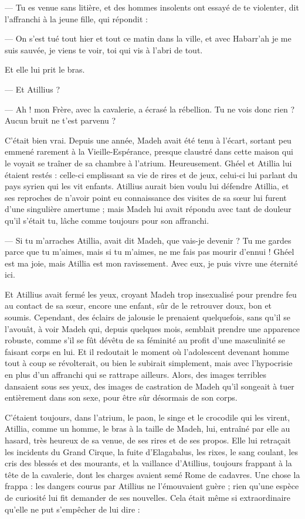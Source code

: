 \documentclass[a4paper, 11pt, oneside, polutonikogreek, french]{article}
\begin{document}
--- Tu es venue sans litière, et des hommes insolents ont essayé de te violenter, dit l'affranchi à la jeune fille, qui répondit :

--- On s'est tué tout hier et tout ce matin dans la ville, et avec Habarr'ah je me suis sauvée, je viens te voir, toi qui vis à l'abri de tout.

Et elle lui prit le bras.

--- Et Atillius ?

--- Ah ! mon Frère, avec la cavalerie, a écrasé la rébellion. Tu ne vois donc rien ? Aucun bruit ne t'est parvenu ?

C'était bien vrai. Depuis une année, Madeh avait été tenu à l'écart, sortant peu emmené rarement à la Vieille-Espérance, presque claustré dans cette maison qui le voyait se traîner de sa chambre à l'atrium. Heureusement. Ghéel et Atillia lui étaient restés : celle-ci emplissant sa vie de rires et de jeux, celui-ci lui parlant du pays syrien qui les vit enfants. Atillius aurait bien voulu lui défendre Atillia, et ses reproches de n'avoir point eu connaissance des visites de sa sœur lui furent d'une singulière amertume ; mais Madeh lui avait répondu avec tant de douleur qu'il s'était tu, lâche comme toujours pour son affranchi.

--- Si tu m'arraches Atillia, avait dit Madeh, que vais-je devenir ? Tu me gardes parce que tu m'aimes, mais si tu m'aimes, ne me fais pas mourir d'ennui ! Ghéel est ma joie, mais Atillia est mon ravissement. Avec eux, je puis vivre une éternité ici.

Et Atillius avait fermé les yeux, croyant Madeh trop insexualisé pour prendre feu au contact de sa sœur, encore une enfant, sûr de le retrouver doux, bon et soumis. Cependant, des éclairs de jalousie le prenaient quelquefois, sans qu'il se l'avouât, à voir Madeh qui, depuis quelques mois, semblait prendre une apparence robuste, comme s'il se fût dévêtu de sa féminité au profit d'une masculinité se faisant corps en lui. Et il redoutait le moment où l'adolescent devenant homme tout à coup se révolterait, ou bien le subirait simplement, mais avec l'hypocrisie en plus d'un affranchi qui se rattrape ailleurs. Alors, des images terribles dansaient sous ses yeux, des images de castration de Madeh qu'il songeait à tuer entièrement dans son sexe, pour être sûr désormais de son corps.

C'étaient toujours, dans l'atrium, le paon, le singe et le crocodile qui les virent, Atillia, comme un homme, le bras à la taille de Madeh, lui, entraîné par elle au hasard, très heureux de sa venue, de ses rires et de ses propos. Elle lui retraçait les incidents du Grand Cirque, la fuite d'Elagabalus, les rixes, le sang coulant, les cris des blessés et des mourants, et la vaillance d'Atillius, toujours frappant à la tête de la cavalerie, dont les charges avaient semé Rome de cadavres. Une chose la frappa : les dangers courus par Atillius ne l'émouvaient guère ; rien qu'une espèce de curiosité lui fit demander de ses nouvelles. Cela était même si extraordinaire qu'elle ne put s'empêcher de lui dire :
\end{document}
